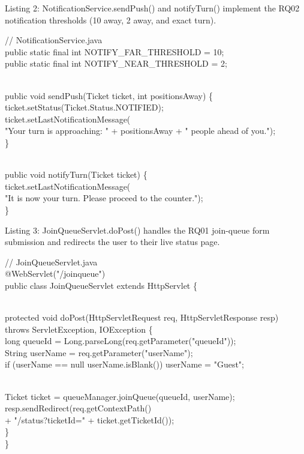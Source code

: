 \documentclass[
]{article}
\begin{document}
Listing 2: NotificationService.sendPush() and notifyTurn() implement the
RQ02 notification thresholds (10 away, 2 away, and exact turn).

// NotificationService.java\\
public static final int NOTIFY\_FAR\_THRESHOLD = 10;\\
public static final int NOTIFY\_NEAR\_THRESHOLD = 2;\\
\strut \\
public void sendPush(Ticket ticket, int positionsAway) \{\\
ticket.setStatus(Ticket.Status.NOTIFIED);\\
ticket.setLastNotificationMessage(\\
"Your turn is approaching: " + positionsAway + " people ahead of
you.");\\
\}\\
\strut \\
public void notifyTurn(Ticket ticket) \{\\
ticket.setLastNotificationMessage(\\
"It is now your turn. Please proceed to the counter.");\\
\}

Listing 3: JoinQueueServlet.doPost() handles the RQ01 join-queue form
submission and redirects the user to their live status page.

// JoinQueueServlet.java\\
@WebServlet("/joinqueue")\\
public class JoinQueueServlet extends HttpServlet \{\\
\strut \\
protected void doPost(HttpServletRequest req, HttpServletResponse
resp)\\
throws ServletException, IOException \{\\
long queueId = Long.parseLong(req.getParameter("queueId"));\\
String userName = req.getParameter("userName");\\
if (userName == null \textbar\textbar{} userName.isBlank()) userName =
"Guest";\\
\strut \\
Ticket ticket = queueManager.joinQueue(queueId, userName);\\
resp.sendRedirect(req.getContextPath()\\
+ "/status?ticketId=" + ticket.getTicketId());\\
\}\\
\}
\end{document}
